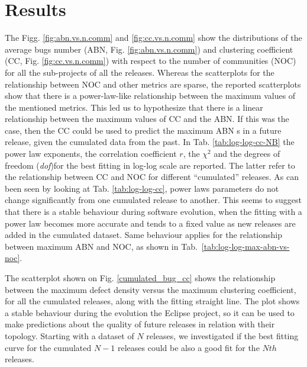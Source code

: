\section{Results}
\label{Results}

The Figg. \ref{fig:abn.vs.n.comm} and \ref{fig:cc.vs.n.comm} show the distributions of the average bugs number 
(ABN, Fig. \ref{fig:abn.vs.n.comm}) 
and clustering coefficient (CC, Fig. \ref{fig:cc.vs.n.comm}) with respect to the number of communities (NOC) 
for all the sub-projects of all the releases. 
Whereas the scatterplots for the relationship between NOC 
and other metrics are sparse, the reported scatterplots show that 
there is a power-law-like relationship between the maximum values of the mentioned metrics. 
This led us to hypothesize that there is a linear relationship between the maximum values of CC and the ABN. 
If this was the case, then the CC could be used to predict the maximum ABN s 
in a future release, given the cumulated data from the past.
In Tab. \ref{tab:log-log-cc-NB} 
the power law exponents, the correlation coefficient $r$, the $\chi^2$
and the degrees of freedom (\textit{dof})for the best fitting in log-log scale are reported. 
The latter refer to  the relationship between CC and NOC for different ``cumulated''
releases.
As can been seen by looking at Tab. \ref{tab:log-log-cc}, power laws parameters do not change significantly 
from one cumulated release to another. This seems to suggest that there is a stable behaviour during 
software evolution, when the fitting with a power law becomes more accurate and tends to a fixed value 
as new releases are added in the cumulated dataset.
Same behaviour applies for the relationship between maximum ABN and NOC, as shown in Tab.~\ref{tab:log-log-max-abn-vs-noc}. 

The scatterplot shown on Fig. \ref{cumulated_bug_cc} shows the relationship between the maximum defect 
density versus the maximum clustering coefficient, 
for all the cumulated releases, along with the fitting straight line.
The plot shows a stable behaviour during the evolution the Eclipse project, so it can be used to make predictions about 
the quality of future releases in relation with their topology.
Starting with a dataset of $N$ releases, we investigated if the best fitting curve for the cumulated $N -1$ releases 
could be also a good fit for the $Nth$ releases.

